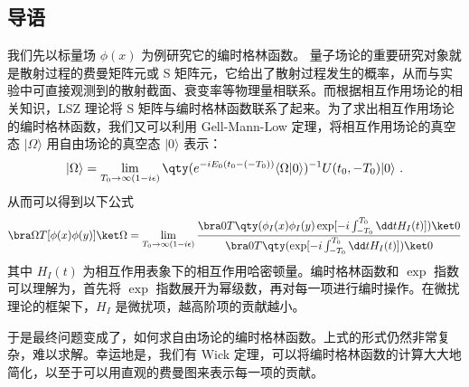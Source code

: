 
\subsection{导语}
我们先以标量场 $\phi(x)$ 为例研究它的编时格林函数。
量子场论的重要研究对象就是散射过程的费曼矩阵元或 S 矩阵元，它给出了散射过程发生的概率，从而与实验中可直接观测到的散射截面、衰变率等物理量相联系。而根据相互作用场论的相关知识，LSZ 理论将 S 矩阵与编时格林函数联系了起来。为了求出相互作用场论的编时格林函数，我们又可以利用 Gell-Mann-Low 定理，将相互作用场论的真空态 $|\Omega\rangle$ 用自由场论的真空态 $|0\rangle$ 表示：
\begin{equation}
|\Omega\rangle = \lim\limits_{T_0\rightarrow \infty(1-i\epsilon)}\qty(e^{-iE_0(t_0-(-T_0))}\langle \Omega|0\rangle )^{-1}U(t_0,-T_0)|0\rangle~.
\end{equation}
从而可以得到以下公式
\begin{equation}
\bra\Omega T[\phi(x)\phi(y)]\ket\Omega = \lim\limits_{T_0\rightarrow \infty(1-i\epsilon)}\frac{\bra 0 T\qty(\phi_I(x)\phi_I(y)\exp[-i\int_{-T_0}^{T_0}\dd t H_I(t)])\ket 0}{\bra 0 T\qty(\exp[-i\int_{-T_0}^{T_0}\dd t H_I(t)])\ket 0}
\end{equation}
其中 $H_I(t)$ 为相互作用表象下的相互作用哈密顿量。编时格林函数和 $\exp$ 指数可以理解为，首先将 $\exp$ 指数展开为幂级数，再对每一项进行编时操作。在微扰理论的框架下，$H_I$ 是微扰项，越高阶项的贡献越小。

于是最终问题变成了，如何求自由场论的编时格林函数。上式的形式仍然非常复杂，难以求解。幸运地是，我们有 Wick 定理，可以将编时格林函数的计算大大地简化，以至于可以用直观的费曼图来表示每一项的贡献。
